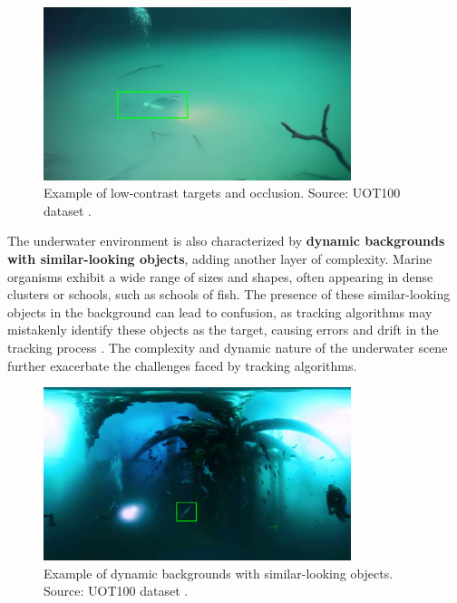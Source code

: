 \begin{figure}[ht]
    \centering
    \includegraphics[width=0.8\textwidth]{images/CenoteAngelita.png}
    \caption{Example of low-contrast targets and occlusion. Source: UOT100 dataset \cite{kezebou2019underwater}.}
    \label{fig:low-contrast}
\end{figure}

The underwater environment is also characterized by \textbf{dynamic backgrounds with similar-looking objects}, adding another layer of complexity. Marine organisms exhibit a wide range of sizes and shapes, often appearing in dense clusters or schools, such as schools of fish. The presence of these similar-looking objects in the background can lead to confusion, as tracking algorithms may mistakenly identify these objects as the target, causing errors and drift in the tracking process \cite{zhang2024webuot}. The complexity and dynamic nature of the underwater scene further exacerbate the challenges faced by tracking algorithms.
\begin{figure}[ht]
    \centering
    \includegraphics[width=0.8\textwidth]{images/Diving360Degree2.png}
    \caption{Example of dynamic backgrounds with similar-looking objects. Source: UOT100 dataset \cite{kezebou2019underwater}.}
    \label{fig:dynamic backgrounds}
\end{figure}

